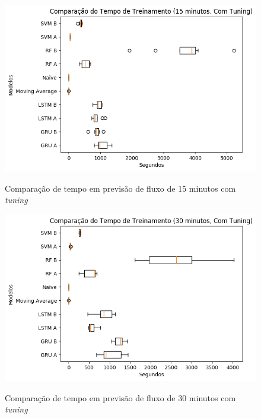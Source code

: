 \begin{figure}[htbp]
    \centering
    \includegraphics[scale=0.8]{monography/img/snapshots/comparacao_do_tempo_de_treinamento_(15_minutos,_com_tuning)_performance_boxes.png}
    \label{figure:comparacao_previsao_tempo_15_com_tuning}
    \caption{Comparação de tempo em previsão de fluxo de 15 minutos com \textit{tuning}}
\end{figure}

\begin{figure}[htbp]
    \centering
    \includegraphics[scale=0.8]{monography/img/snapshots/comparacao_do_tempo_de_treinamento_(30_minutos,_com_tuning)_performance_boxes.png}
    \label{figure:comparacao_previsao_tempo_30_com_tuning}
    \caption{Comparação de tempo em previsão de fluxo de 30 minutos com \textit{tuning}}
\end{figure}

